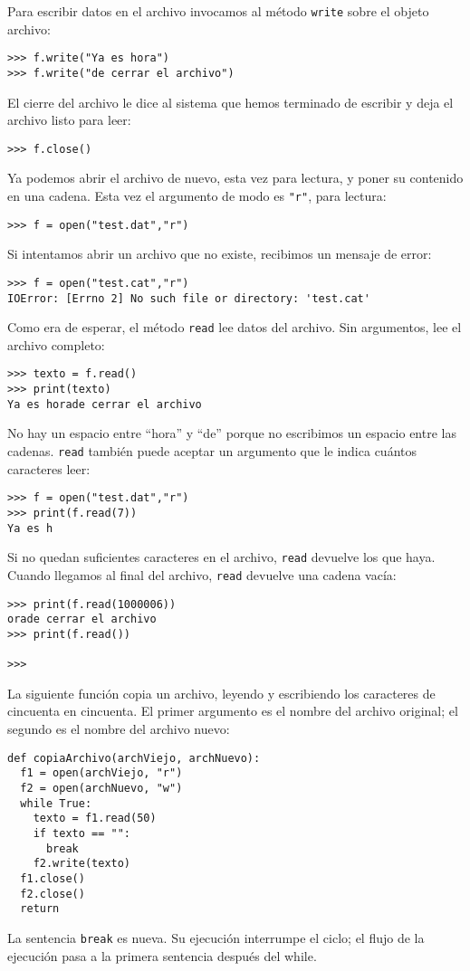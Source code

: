 Para escribir datos en el archivo invocamos al método \texttt{write}
sobre el objeto archivo:
\begin{lstlisting}
>>> f.write("Ya es hora")
>>> f.write("de cerrar el archivo")
\end{lstlisting}
El cierre del archivo le dice al sistema que hemos terminado de escribir
y deja el archivo listo para leer:
\begin{lstlisting}
>>> f.close()
\end{lstlisting}
Ya podemos abrir el archivo de nuevo, esta vez para lectura, y poner
su contenido en una cadena. Esta vez el argumento de modo es {\verb+"r"+},
para lectura:
\begin{lstlisting}
>>> f = open("test.dat","r")
\end{lstlisting}
Si intentamos abrir un archivo que no existe, recibimos un mensaje
de error:

\begin{lstlisting}
>>> f = open("test.cat","r")
IOError: [Errno 2] No such file or directory: 'test.cat'
\end{lstlisting}
Como era de esperar, el método \texttt{read} lee datos del archivo.
Sin argumentos, lee el archivo completo:
\begin{lstlisting}
>>> texto = f.read()
>>> print(texto)
Ya es horade cerrar el archivo
\end{lstlisting}
No hay un espacio entre ``hora'' y ``de'' porque no escribimos
un espacio entre las cadenas. \texttt{read} también puede aceptar
un argumento que le indica cuántos caracteres leer:
\begin{lstlisting}
>>> f = open("test.dat","r")
>>> print(f.read(7))
Ya es h
\end{lstlisting}
Si no quedan suficientes caracteres en el archivo, \texttt{read} devuelve
los que haya. Cuando llegamos al final del archivo, \texttt{read}
devuelve una cadena vacía:
\begin{lstlisting}
>>> print(f.read(1000006))
orade cerrar el archivo
>>> print(f.read())

>>>
\end{lstlisting}
La siguiente función copia un archivo, leyendo y escribiendo los caracteres
de cincuenta en cincuenta. El primer argumento es el nombre del archivo
original; el segundo es el nombre del archivo nuevo:
\begin{lstlisting}
def copiaArchivo(archViejo, archNuevo):
  f1 = open(archViejo, "r")
  f2 = open(archNuevo, "w")
  while True:
    texto = f1.read(50)
    if texto == "":
      break
    f2.write(texto)
  f1.close()
  f2.close()
  return
\end{lstlisting}
La sentencia \texttt{break} es nueva. Su ejecución interrumpe el ciclo;
el flujo de la ejecución pasa a la primera sentencia después del while.

